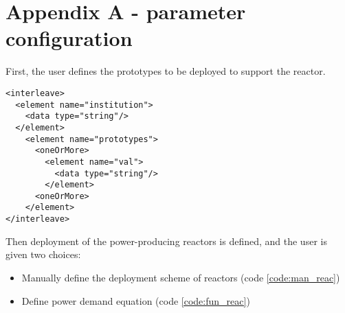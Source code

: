 \documentclass[12pt,letterpaper]{article}
\newenvironment{code}{\captionsetup{type=listing}}{}
\begin{document}
\begin{comment}
\item Do the related fuel cycle facilities exit upon demand decrease?
\begin{verbatim}
TEST(ReactorTests, DDDeploy_NO) {
    [Example input with the following attributes:]
        [int simdur = 20;]
        [Defines reactor with zero refueling cycle and operation 
        cycle of 1 month]
        [Defines fuel cycle facilities parameters]
        [Defines Reactor Deploy Scheme / Power Demand]
        [Decreasing Fuel Demand with Time]
    [Run test]
    [Test if fuel facility is deployed in the beginning]
    [Test if fuel facility exits later in the simulation (have 
    analytic solution)]
}
\end{verbatim}


\end{enumerate}



\section{Advanced Fuel Cycles}
\end{comment}

\section{Appendix A - parameter configuration}

First, the user defines the prototypes to be deployed
to support the reactor.

\begin{code}

\begin{verbatim}
<interleave>
  <element name="institution">
    <data type="string"/>
  </element>
    <element name="prototypes">
      <oneOrMore>
        <element name="val">
          <data type="string"/>
        </element>
      <oneOrMore>
    </element>
</interleave>

\end{verbatim}
\label{code:pro}
\end{code}


Then deployment of the power-producing reactors is defined, and the user
is given two choices:
\begin{itemize}
  \item Manually define the deployment scheme of reactors (code \ref{code:man_reac})
  \item Define power demand equation (code \ref{code:fun_reac})
\end{itemize}
\end{document}
